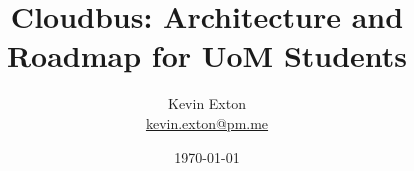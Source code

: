\title{Cloudbus: Architecture and Roadmap for UoM Students}
\author[K. Exton]{
	\centering
	Kevin Exton\\
	\href{mailto:kevin.exton@pm.me}{\footnotesize kevin.exton@pm.me}
}
\date{\today}
\begin{frame}[plain]
	\titlepage
	\centering
\end{frame}